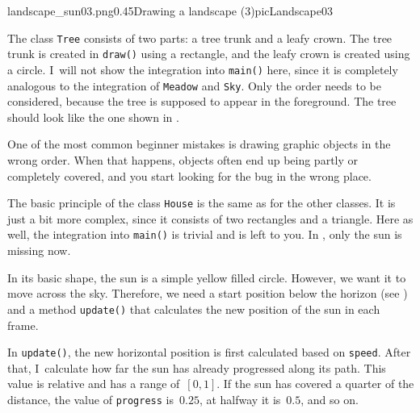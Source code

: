 %
{landscape_sun03.png}{0.45}{Drawing a landscape (3)}{picLandscape03}

The class \texttt{Tree} consists of two parts: a tree trunk and a leafy crown. The tree trunk is created in \texttt{draw()} using a rectangle, and the leafy crown is created using a circle. I~will not show the integration into \texttt{main()} here, since it is completely analogous to the integration of \texttt{Meadow} and \texttt{Sky}. Only the order needs to be considered, because the tree is supposed to appear in the foreground. The tree should look like the one shown in .

\begin{hintbox}
	One of the most common beginner mistakes is drawing graphic objects in the wrong order. When that happens, objects often end up being partly or completely covered, and you start looking for the bug in the wrong place.
\end{hintbox}


The basic principle of the class \texttt{House} is the same as for the other classes. It is just a bit more complex, since it consists of two rectangles and a triangle. Here as well, the integration into \texttt{main()} is trivial and is left to you. In , only the sun is missing now.




In its basic shape, the sun is a simple yellow filled circle. However, we want it to move across the sky. Therefore, we need a start position below the horizon (see ) and a method \texttt{update()} that calculates the new position of the sun in each frame.

In \texttt{update()}, the new horizontal position is first calculated based on \texttt{speed}. After that, I~calculate how far the sun has already progressed along its path. This value is relative and has a range of~$[0, 1]$. If the sun has covered a quarter of the distance, the value of \texttt{progress} is~$0.25$, at halfway it is~$0.5$, and so on.

